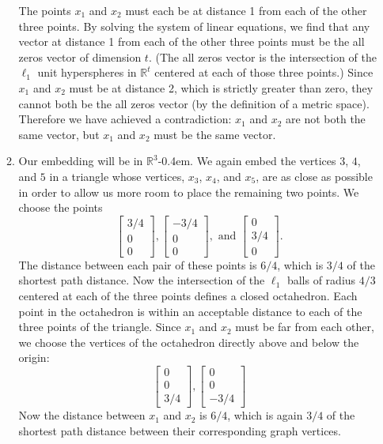 \documentclass{article}
\newcommand{\R}{\mathbb{R}}
\newcommand{\0}{\mathbf{0}}
\begin{document}
\begin{enumerate}
\begin{enumerate}
    The points $x_1$ and $x_2$ must each be at distance 1 from each of the other three points.
    By solving the system of linear equations, we find that any vector at distance 1 from each of the other three points must be the all zeros vector of dimension $t$.
    (The all zeros vector is the intersection of the $\ell_1$ unit hyperspheres in $\R^t$ centered at each of those three points.)
    Since $x_1$ and $x_2$ must be at distance 2, which is strictly greater than zero, they cannot both be the all zeros vector (by the definition of a metric space).
    Therefore we have achieved a contradiction: $x_1$ and $x_2$ are not both the same vector, but $x_1$ and $x_2$ must be the same vector.

  \item
    Our embedding will be in $\R^3$\kern-0.4em.
    We again embed the vertices $3$, $4$, and $5$ in a triangle whose vertices, $x_3$, $x_4$, and $x_5$, are as close as possible in order to allow us more room to place the remaining two points.
    We choose the points
    \begin{equation*}
      \begin{bmatrix}
        3/4 \\ 0 \\ 0
      \end{bmatrix},
      \begin{bmatrix}
        -3/4 \\ 0 \\ 0
      \end{bmatrix}, \text{ and }
      \begin{bmatrix}
        0 \\ 3/4 \\ 0
      \end{bmatrix}.
    \end{equation*}
    The distance between each pair of these points is $6/4$, which is $3 / 4$ of the shortest path distance.
    Now the intersection of the $\ell_1$ balls of radius $4/3$ centered at each of the three points defines a closed octahedron.
    Each point in the octahedron is within an acceptable distance to each of the three points of the triangle.
    Since $x_1$ and $x_2$ must be far from each other, we choose the vertices of the octahedron directly above and below the origin:
    \begin{equation*}
      \begin{bmatrix}
        0 \\ 0 \\ 3/4
      \end{bmatrix},
      \begin{bmatrix}
        0 \\ 0 \\ -3/4
      \end{bmatrix}
    \end{equation*}
    Now the distance between $x_1$ and $x_2$ is $6/4$, which is again $3/4$ of the shortest path distance between their corresponding graph vertices.
  \end{enumerate}
\end{enumerate}

\printbibliography
\end{document}
